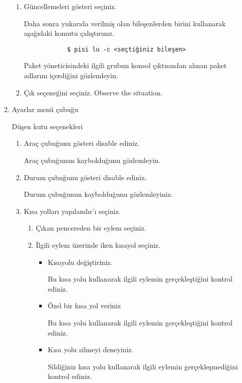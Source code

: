 \documentclass[a4paper,10pt]{article}
\begin{document}
\begin{enumerate}
\begin{enumerate}
\begin{enumerate}
            \item Güncellemeleri gösteri seçiniz.

             Daha sonra yukarıda verilmiş olan bileşenlerden birini kullanarak aşağıdaki komutu çalıştırınız.
            \begin{verbatim}
            $ pisi lu -c <seçtiğiniz bileşen>
            \end{verbatim}
            Paket yöneticisindeki ilgili grubun konsol çıktısından alınan paket adlarını içerdiğini gözlemleyin.
    
            \item Çık seçeneğini seçiniz. 
            Observe the situation.
        \end{enumerate}
    
        \item Ayarlar menü çubuğu
        
	 Düşen kutu seçenekleri
	 \begin{enumerate}
            \item Araç çubuğunu gösteri disable ediniz.
	
	     Araç çubuğunun kaybolduğunu gözlemleyin.
            \item Durum çubuğunu gösteri disable ediniz.
  
	    Durum çubuğunun kaybolduğunu gözlemleyiniz.

            \item Kısa yolları yapılandır'ı seçiniz.

            \begin{enumerate}
                \item Çıkan pencereden bir eylem seçiniz.

                \item İlgili eylem üzerinde iken kısayol seçiniz.
                \begin{itemize}
                    \item Kısayolu değiştiriniz.

		    Bu kısa yolu kullanarak ilgili eylemin gerçekleştiğini kontrol ediniz.
                    \item Özel bir kısa yol veriniz

		    Bu kısa yolu kullanarak ilgili eylemin gerçekleştiğini kontrol ediniz.
                    \item Kısa yolu silmeyi deneyiniz.
		    
		    Sildiğiniz kısa yolu kullanarak ilgili eylemin gerçekleşmediğini kontrol ediniz.
		    

\end{itemize}
\end{enumerate}
\end{enumerate}
\end{enumerate}
\end{enumerate}
\end{document}
